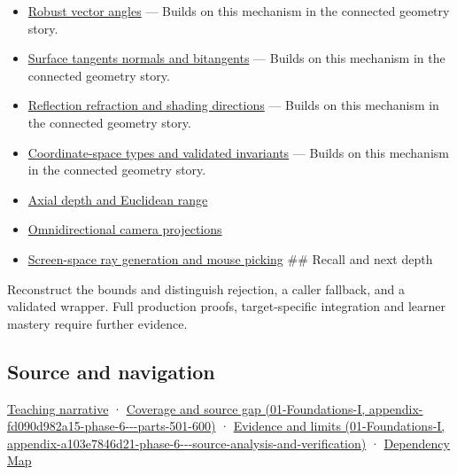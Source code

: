 \begin{itemize}
\item
  \hyperref[appendix-e569e60e18e6]{Robust vector angles} --- Builds on this mechanism in the connected geometry story.
\item
  \hyperref[appendix-e31893dec985]{Surface tangents normals and bitangents} --- Builds on this mechanism in the connected geometry story.
\item
  \hyperref[appendix-44e00863b4d5]{Reflection refraction and shading directions} --- Builds on this mechanism in the connected geometry story.
\item
  \hyperref[appendix-380a220e2529]{Coordinate-space types and validated invariants} --- Builds on this mechanism in the connected geometry story.
\item
  \hyperref[appendix-cac01ebeeb11]{Axial depth and Euclidean range}
\item
  \hyperref[appendix-fc99ad39f351]{Omnidirectional camera projections}
\item
  \hyperref[appendix-f1a6d43e80d1]{Screen-space ray generation and mouse picking} \#\# Recall and next depth
\end{itemize}

Reconstruct the bounds and distinguish rejection, a caller fallback, and a validated wrapper. Full production proofs, target-specific integration and learner mastery require further evidence.

\subsection{Source and navigation}\label{appendix-f744e41b95b4-source-and-navigation}

\href{Continuous\%20Notes/Computing\%20Foundations\%20-\%20From\%20Bits\%20to\%20C++\%20and\%20Systems\%20APIs\#A\%20direction\%20can\%20exist\%20even\%20when\%20the\%20naive\%20length\%20overflows}{Teaching narrative} · \href{../01-Foundations-I/main.pdf\#nameddest=appendix-fd090d982a15-phase-6---parts-501-600}{Coverage and source gap (01-Foundations-I, appendix-fd090d982a15-phase-6-\/-\/-parts-501-600)} · \href{../01-Foundations-I/main.pdf\#nameddest=appendix-a103e7846d21-phase-6---source-analysis-and-verification}{Evidence and limits (01-Foundations-I, appendix-a103e7846d21-phase-6-\/-\/-source-analysis-and-verification)} · \hyperref[appendix-4ad47bdd269a]{Dependency Map}
